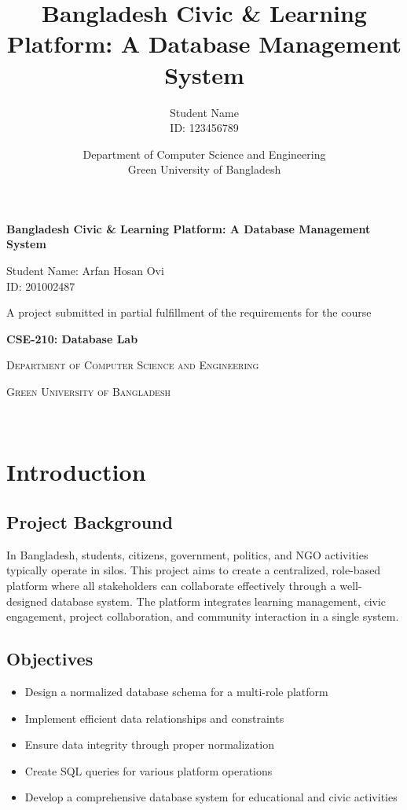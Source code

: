 \documentclass[12pt]{report}
\title{Bangladesh Civic \& Learning Platform: A Database Management System}
\author{Student Name \\ ID: 123456789}
\date{Department of Computer Science and Engineering \\ Green University of Bangladesh}
\begin{document}
    \begin{titlepage}
        \centering
        \vspace*{2cm}
        {\Huge \textbf{Bangladesh Civic \& Learning Platform: A Database Management System} \par}
        \vspace{1.5cm}
        {\Large \textup{Student Name: Arfan Hosan Ovi} \\ ID: 201002487 \par}
        \vspace{2cm}
        {\Large A project submitted in partial fulfillment of the requirements for the course \par}
        \vspace{0.5cm}
        {\Large \textbf{CSE-210: Database Lab} \par}
        \vspace{2cm}
        {\Large \textsc{Department of Computer Science and Engineering} \par}
        \vspace{0.5cm}
        {\Large \textsc{Green University of Bangladesh} \par}
        \vspace{0.5cm}
        {\Large \monthname \ \the\year \par}
    \end{titlepage}
    
    \tableofcontents
    \listoffigures
    \listoftables
  
    \chapter{Introduction}
    
    \section{Project Background}
    In Bangladesh, students, citizens, government, politics, and NGO activities typically operate in silos. This project aims to create a centralized, role-based platform where all stakeholders can collaborate effectively through a well-designed database system. The platform integrates learning management, civic engagement, project collaboration, and community interaction in a single system.
    
    \section{Objectives}
    \begin{itemize}
        \item Design a normalized database schema for a multi-role platform
        \item Implement efficient data relationships and constraints
        \item Ensure data integrity through proper normalization
        \item Create SQL queries for various platform operations
        \item Develop a comprehensive database system for educational and civic activities
    \end{itemize}
    
\end{document}
